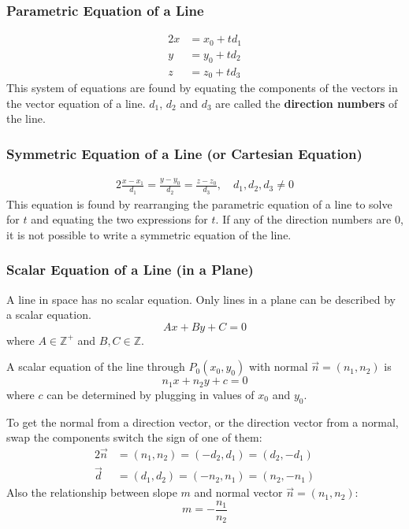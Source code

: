 \documentclass[letterpaper, 12pt]{report}
\newcommand\Z{\mathbb{Z}}
\theoremstyle{definition}
\numberwithin{equation}{section}
\begin{document}
\subsubsection{Parametric Equation of a Line}
\begin{alignat}{2}{}
	x &= x_0 + td_1 \\
	y &= y_0 + td_2 \\
	z &= z_0 + td_3
\end{alignat}
This system of equations are found by equating the components of the vectors in the vector equation of a line. $d_1$, $d_2$ and $d_3$ are called the \textbf{direction numbers} of the line.

\subsubsection{Symmetric Equation of a Line (or Cartesian Equation)}
\begin{alignat}{2}{}
	\frac{x-x_1}{d_1} = \frac{y-y_0}{d_2} = \frac{z-z_0}{d_3}, \quad d_1,d_2,d_3 \ne 0
\end{alignat}
This equation is found by rearranging the parametric equation of a line to solve for $t$ and equating the two expressions for $t$. If any of the direction numbers are $0$, it is not possible to write a symmetric equation of the line.

\subsubsection{Scalar Equation of a Line (in a Plane)}
A line in space has no scalar equation. Only lines in a plane can be described by a scalar equation.
\begin{equation}
	Ax+By+C = 0
\end{equation}
where $A \in \Z^+$ and $B,C \in \Z$.

\bigskip
\noindent
A scalar equation of the line through $P_0(x_0,y_0)$ with normal $\vec n = (n_1,n_2)$ is
\begin{equation}
	n_1x + n_2y + c = 0
\end{equation}
where $c$ can be determined by plugging in values of $x_0$ and $y_0$.

\bigskip \noindent
To get the normal from a direction vector, or the direction vector from a normal, swap the components switch the sign of one of them:
\begin{alignat*}{2}
	\vec n &= (n_1,n_2) = (-d_2, d_1) = (d_2, -d_1) \\
	\vec d &= (d_1,d_2) = (-n_2, n_1) = (n_2, -n_1)
\end{alignat*}
Also the relationship between slope $m$ and normal vector $\vec n = (n_1,n_2)$:
\begin{equation*}
	m = - \frac{n_1}{n_2}
\end{equation*}
\end{document}
